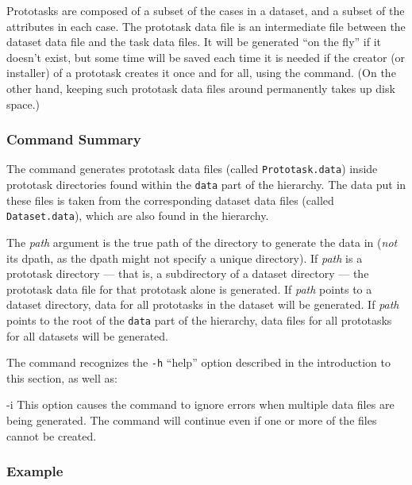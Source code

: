 Prototasks are composed of a subset of the cases in a dataset, and a
subset of the attributes in each case.  The prototask data file is an
intermediate file between the dataset data file and the task data
files.  It will be generated ``on the fly'' if it doesn't exist, but
some time will be saved each time it is needed if the creator (or
installer) of a prototask creates it once and for all, using the
\dgenproto{} command.  (On the other hand, keeping such prototask data 
files around permanently takes up disk space.)

\subsubsection*{Command Summary}

The \dgenproto{} command generates prototask data files (called
\texttt{Prototask.data}) inside prototask directories found within the
\texttt{data} part of the \delve{} hierarchy.  The data put in these
files is taken from the corresponding dataset data files
(called \texttt{Dataset.data}), which are also found in the \delve{}
hierarchy.  

The \textit{path} argument is the true path of the directory to
generate the data in (\emph{not} its dpath, as the dpath might not
specify a unique directory).  If \textit{path} is a prototask
directory --- that is, a subdirectory of a \delve{} dataset directory
--- the prototask data file for that prototask alone is generated.  If
\textit{path} points to a dataset directory, data for all prototasks
in the dataset will be generated.  If \textit{path} points to the root
of the \texttt{data} part of the \delve{} hierarchy, data files for
all prototasks for all datasets will be generated.

The \dgenproto{} command recognizes the \texttt{-h} ``help'' option
described in the introduction to this section, as well as:
\begin{ttdescription}
\item[-i] 
    This option causes the command to ignore errors when multiple data
    files are being generated.  The command will continue even if one
    or more of the files cannot be created.
\end{ttdescription}

\subsubsection*{Example}

